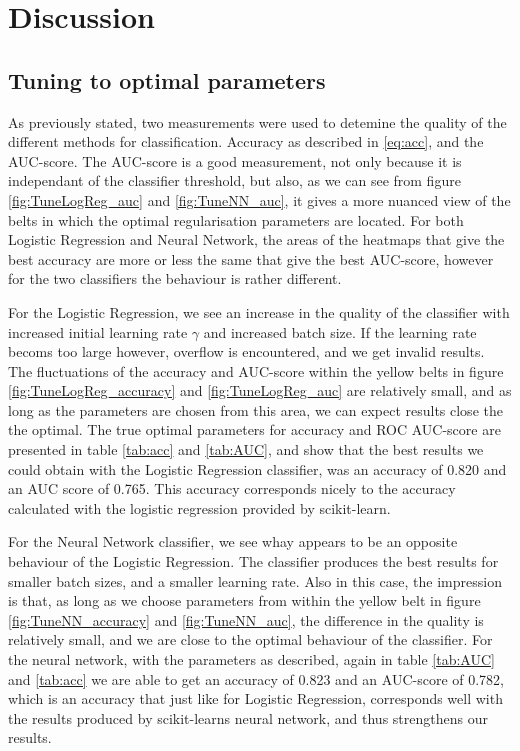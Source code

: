 \section{Discussion}
\label{sec:discussion}

\subsection{Tuning to optimal parameters}
As previously stated, two measurements were used to detemine the quality of the different methods for classification. Accuracy as described in \eqref{eq:acc}, and the AUC-score. The AUC-score is a good measurement, not only because it is independant of the classifier threshold, but also, as we can see from figure \ref{fig:TuneLogReg_auc} and \ref{fig:TuneNN_auc}, it gives a more nuanced view of the belts in which the optimal regularisation parameters are located. For both Logistic Regression and Neural Network, the areas of the heatmaps that give the best accuracy are more or less the same that give the best AUC-score, however for the two classifiers the behaviour is rather different.

For the Logistic Regression, we see an increase in the quality of the classifier with increased initial learning rate $\gamma$ and increased batch size. If the learning rate becoms too large however, overflow is encountered, and we get invalid results. The fluctuations of the accuracy and AUC-score within the yellow belts in figure \ref{fig:TuneLogReg_accuracy} and \ref{fig:TuneLogReg_auc} are relatively small, and as long as the parameters are chosen from this area, we can expect results close the the optimal. The true optimal parameters for accuracy and ROC AUC-score are presented in table \ref{tab:acc} and \ref{tab:AUC}, and show that the best results we could obtain with the Logistic Regression classifier, was an accuracy of 0.820 and an AUC score of 0.765. This accuracy corresponds nicely to the accuracy calculated with the logistic regression provided by scikit-learn.

For the Neural Network classifier, we see whay appears to be an opposite behaviour of the Logistic Regression. The classifier produces the best results for smaller batch sizes, and a smaller learning rate. Also in this case, the impression is that, as long as we choose parameters from within the yellow belt in figure \ref{fig:TuneNN_accuracy} and \ref{fig:TuneNN_auc}, the difference in the quality is relatively small, and we are close to the optimal behaviour of the classifier. For the neural network, with the parameters as described, again in table \ref{tab:AUC} and \ref{tab:acc} we are able to get an accuracy of 0.823 and an AUC-score of 0.782, which is an accuracy that just like for Logistic Regression, corresponds well with the results produced by scikit-learns neural network, and thus strengthens our results.

